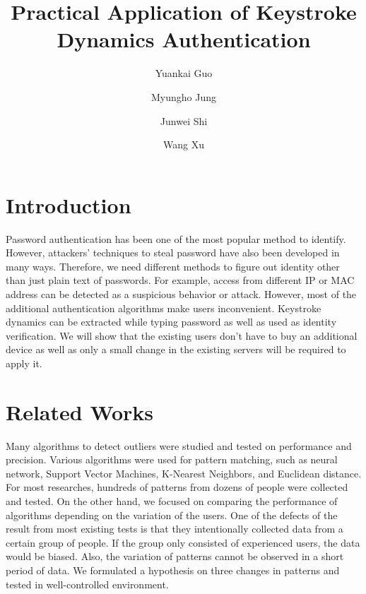\documentclass[twocolumn,showpacs,%
  nofootinbib,aps,%
  eqsecnum,prd,notitlepage,showkeys,10pt]{revtex4-1}
\begin{document}
\title{Practical Application of Keystroke Dynamics Authentication}

\author{Yuankai Guo}
\author{Myungho Jung}
\author{Junwei Shi}
\author{Wang Xu}


\maketitle

\section{Introduction}
Password authentication has been one of the most popular method to identify. However, attackers' techniques to steal password have also been developed in many ways. Therefore, we need different methods to figure out identity other than just plain text of passwords. For example, access from different IP or MAC address can be detected as a suspicious behavior or attack. However, most of the additional authentication algorithms make users inconvenient. Keystroke dynamics can be extracted while typing password as well as used as identity verification\cite{gaines1980authentication}. We will show that the existing users don't have to buy an additional device as well as only a small change in the existing servers will be required to apply it.

\section{Related Works}
Many algorithms to detect outliers were studied and tested on performance and precision\cite{shanmugapriya2009survey}. Various algorithms were used for pattern matching, such as neural network, Support Vector Machines, K-Nearest Neighbors, and Euclidean distance. For most researches, hundreds of patterns from dozens of people were collected and tested. On the other hand, we focused on comparing the performance of algorithms depending on the variation of the users. One of the defects of the result from most existing tests is that they intentionally collected data from a certain group of people. If the group only consisted of experienced users, the data would be biased. Also, the variation of patterns cannot be observed in a short period of data. We formulated a hypothesis on three changes in patterns and tested in well-controlled environment.
\end{document}
